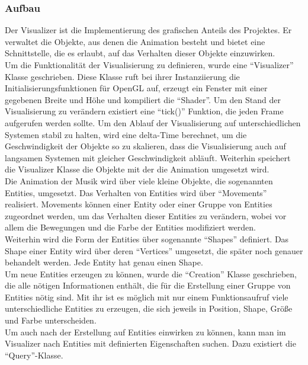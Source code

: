 \documentclass[11pt,a4paper]{article}
\begin{document}
\subsubsection*{Aufbau}
Der Visualizer ist die Implementierung des grafischen Anteils des Projektes. Er verwaltet die Objekte, aus denen die Animation besteht und bietet eine Schnittstelle, die es erlaubt, auf das Verhalten dieser Objekte einzuwirken.\\
Um die Funktionalität der Visualisierung zu definieren, wurde eine ``Visualizer'' Klasse geschrieben. Diese Klasse ruft bei ihrer Instanziierung die Initialisierungsfunktionen für OpenGL auf, erzeugt ein Fenster mit einer gegebenen Breite und Höhe und kompiliert die ``Shader''. Um den Stand der Visualisierung zu verändern existiert eine ``tick()'' Funktion, die jeden Frame aufgerufen werden sollte. Um den Ablauf der Visualisierung auf unterschiedlichen Systemen stabil zu halten, wird eine delta-Time berechnet, um die Geschwindigkeit der Objekte so zu skalieren, dass die Visualisierung auch auf langsamen Systemen mit gleicher Geschwindigkeit abläuft. Weiterhin speichert die Visualizer Klasse die Objekte mit der die Animation umgesetzt wird.\\
Die Animation der Musik wird über viele kleine Objekte, die sogenannten Entities, umgesetzt. Das Verhalten von Entities wird über ``Movements'' realisiert. Movements können einer Entity oder einer Gruppe von Entities zugeordnet werden, um das Verhalten dieser Entities zu verändern, wobei vor allem die Bewegungen und die Farbe der Entities modifiziert werden.\\
Weiterhin wird die Form der Entities über sogenannte ``Shapes'' definiert. Das Shape einer Entity wird über deren ``Vertices'' umgesetzt, die später noch genauer behandelt werden. Jede Entity hat genau einen Shape.\\
Um neue Entities erzeugen zu können, wurde die ``Creation'' Klasse geschrieben, die alle nötigen Informationen enthält, die für die Erstellung einer Gruppe von Entities nötig sind. Mit ihr ist es möglich mit nur einem Funktionsaufruf viele unterschiedliche Entities zu erzeugen, die sich jeweils in Position, Shape, Größe und Farbe unterscheiden.\\
Um auch nach der Erstellung auf Entities einwirken zu können, kann man im Visualizer nach Entities mit definierten Eigenschaften suchen. Dazu existiert die ``Query''-Klasse.

\end{document}
